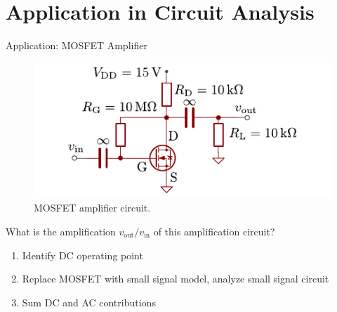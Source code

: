 \section{Application in Circuit Analysis}

\begin{frame}{Application: MOSFET Amplifier}
    \begin{figure}
        \centering
        \includegraphics{../assets/example_circuit_small.pdf}
        \caption{MOSFET amplifier circuit.}
        \label{fig:mosfet_amplifier}
    \end{figure}

    What is the amplification $v_\mathrm{out}/v_\mathrm{in}$ of this amplification circuit?
    \begin{enumerate}
        \item Identify DC operating point
        \item Replace MOSFET with small signal model, analyze small signal circuit
        \item Sum DC and AC contributions
    \end{enumerate}
\end{frame}

